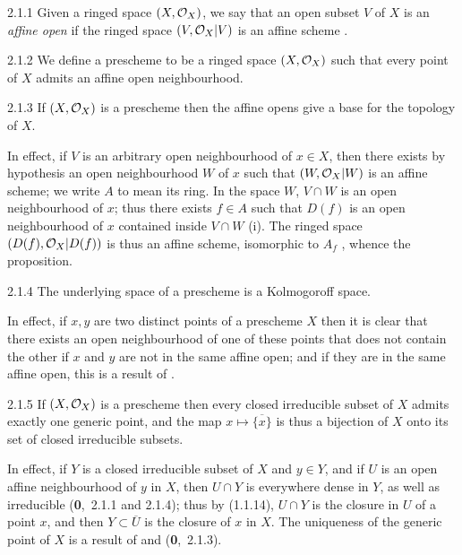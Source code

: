 
\begin{env}{2.1.1}
\label{env-1.2.1.1}
Given a ringed space $(X,\mathcal{O}_X)$, we say that an open subset
$V$ of $X$ is an \emph{affine open} if the ringed space $(V,\mathcal{O}_X|V)$ is an
affine scheme .
\end{env}

\begin{envr}[Definition]{2.1.2}
\label{defn-1.2.1.2}
We define a prescheme to be a ringed space
$(X,\mathcal{O}_X)$ such that every point of $X$ admits an affine open neighbourhood.
\end{envr}

\begin{env}[Proposition]{2.1.3}
\label{prop-2.1.3}
If $(X,\mathcal{O}_X)$ is a prescheme then
the affine opens give a base for the topology of $X$.
\end{env}

In effect, if $V$ is an arbitrary open neighbourhood of $x\in X$, then there
exists by hypothesis an open neighbourhood $W$ of $x$ such that $(W,\mathcal{O}_X|W)$ is
an affine scheme; we write $A$ to mean its ring.  In the space $W$, $V\cap W$ is
an open neighbourhood of $x$; thus there exists $f\in A$ such that $D(f)$ is an
open neighbourhood of $x$ contained inside $V\cap W$  (i).  The ringed
space $(D(f),\mathcal{O}_X|D(f))$ is thus an affine scheme, isomorphic to $A_f$
, whence the proposition.

\begin{env}[Proposition]{2.1.4}
\label{prop-1.2.1.4}
The underlying space of a prescheme is a Kolmogoroff space.
\end{env}

In effect, if $x,y$ are two distinct points of a prescheme $X$ then it is clear
that there exists an open neighbourhood of one of these points that does not
contain the other if $x$ and $y$ are not in the same affine open; and if they
are in the same affine open, this is a result of .

\begin{env}[Proposition]{2.1.5}
\label{prop-1.2.1.5}
If $(X,\mathcal{O}_X)$ is a prescheme then every closed
irreducible subset of $X$ admits exactly one generic point, and the map
$x\mapsto\overline{\{x\}}$ is thus a bijection of $X$ onto its set of closed
irreducible subsets.
\end{env}

In effect, if $Y$ is a closed irreducible subset of $X$ and $y\in Y$, and if $U$
is an open affine neighbourhood of $y$ in $X$, then $U\cap Y$ is everywhere
dense in $Y$, as well as irreducible (\textbf{0},~2.1.1 and 2.1.4); thus by
(1.1.14), $U\cap Y$ is the closure in $U$ of a point $x$, and then
$Y\subset\overline{U}$ is the closure of $x$ in $X$.  The uniqueness of the
generic point of $X$ is a result of  and (\textbf{0},~2.1.3).

